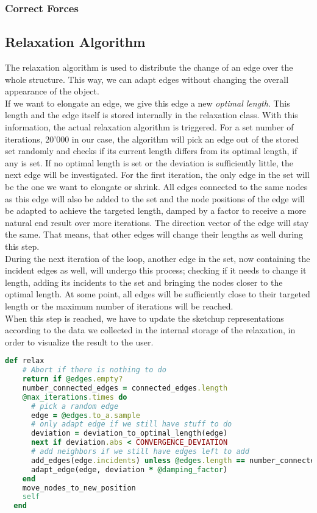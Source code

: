 \subsubsection{Correct Forces}

\subsection{Relaxation Algorithm}\label{sec:relaxation}
The relaxation algorithm is used to distribute the change of an edge over the whole structure. This way, we can adapt edges without changing the overall appearance of the object.\\
If we want to elongate an edge, we give this edge a new \textit{optimal length}. This length and the edge itself is stored internally in the relaxation class. With this information, the actual relaxation algorithm is triggered. For a set number of iterations, 20'000 in our case, the algorithm will pick an edge out of the stored set randomly and checks if its current length differs from its optimal length, if any is set. If no optimal length is set or the deviation is sufficiently little, the next edge will be investigated. For the first iteration, the only edge in the set will be the one we want to elongate or shrink. All edges connected to the same nodes as this edge will also be added to the set and the node positions of the edge will be adapted to achieve the targeted length, damped by a factor to receive a more natural end result over more iterations. The direction vector of the edge will stay the same. That means, that other edges will change their lengths as well during this step.\\
During the next iteration of the loop, another edge in the set, now containing the incident edges as well, will undergo this process; checking if it needs to change it length, adding its incidents to the set and bringing the nodes closer to the optimal length. At some point, all edges will be sufficiently close to their targeted length or the maximum number of iterations will be reached.\\
When this step is reached, we have to update the sketchup representations according to the data we collected in the internal storage of the relaxation, in order to visualize the result to the user.

\begin{lstlisting}[language=Ruby, label={lst:relaxation}, caption=The relaxation algorithm]
def relax
    # Abort if there is nothing to do
    return if @edges.empty?
    number_connected_edges = connected_edges.length
    @max_iterations.times do
      # pick a random edge
      edge = @edges.to_a.sample
      # only adapt edge if we still have stuff to do
      deviation = deviation_to_optimal_length(edge)
      next if deviation.abs < CONVERGENCE_DEVIATION
      # add neighbors if we still have edges left to add
      add_edges(edge.incidents) unless @edges.length == number_connected_edges
      adapt_edge(edge, deviation * @damping_factor)
    end
    move_nodes_to_new_position
    self
  end
\end{lstlisting}

